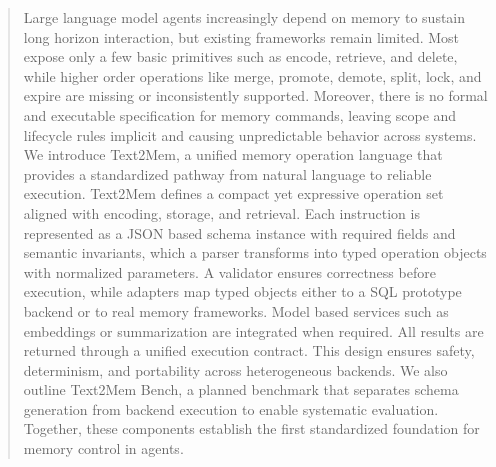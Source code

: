 \documentclass[conference]{IEEEtran}
\begin{document}
\begin{abstract}
Large language model agents increasingly depend on memory to sustain long horizon interaction, but existing frameworks remain limited. Most expose only a few basic primitives such as encode, retrieve, and delete, while higher order operations like merge, promote, demote, split, lock, and expire are missing or inconsistently supported. Moreover, there is no formal and executable specification for memory commands, leaving scope and lifecycle rules implicit and causing unpredictable behavior across systems.
We introduce Text2Mem, a unified memory operation language that provides a standardized pathway from natural language to reliable execution. Text2Mem defines a compact yet expressive operation set aligned with encoding, storage, and retrieval. Each instruction is represented as a JSON based schema instance with required fields and semantic invariants, which a parser transforms into typed operation objects with normalized parameters. A validator ensures correctness before execution, while adapters map typed objects either to a SQL prototype backend or to real memory frameworks. Model based services such as embeddings or summarization are integrated when required. All results are returned through a unified execution contract.
This design ensures safety, determinism, and portability across heterogeneous backends. We also outline Text2Mem Bench, a planned benchmark that separates schema generation from backend execution to enable systematic evaluation. Together, these components establish the first standardized foundation for memory control in agents.
\end{abstract}
\end{document}
